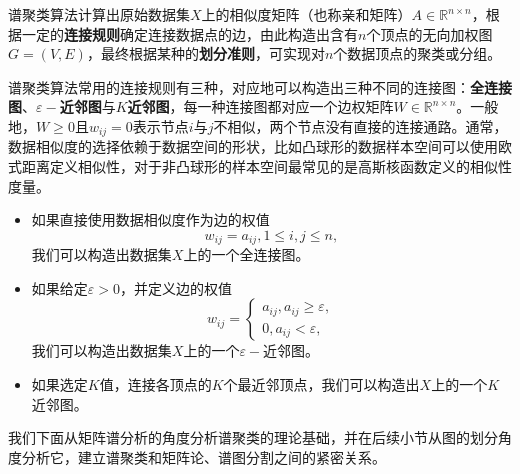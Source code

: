 谱聚类算法计算出原始数据集$X$上的相似度矩阵（也称亲和矩阵）$A\in \mathbb R^{n\times n}$，根据一定的\textbf{连接规则}确定连接数据点的边，由此构造出含有$n$个顶点的无向加权图$G=(V, E)$，最终根据某种的\textbf{划分准则}，可实现对$n$个数据顶点的聚类或分组。

谱聚类算法常用的连接规则有三种，对应地可以构造出三种不同的连接图：\textbf{全连接图}、\textbf{$\varepsilon-$近邻图}与\textbf{$K$近邻图}，每一种连接图都对应一个边权矩阵$W\in \mathbb R^{n\times n}$。一般地，$W\ge 0$且$w_{ij}=0$表示节点$i$与$j$不相似，两个节点没有直接的连接通路。通常，数据相似度的选择依赖于数据空间的形状，比如凸球形的数据样本空间可以使用欧式距离定义相似性，对于非凸球形的样本空间最常见的是高斯核函数定义的相似性度量。
\begin{itemize}
  \item 如果直接使用数据相似度作为边的权值
        \[
            w_{ij}=a_{ij}, 1\le i,j \le n,
        \]
        我们可以构造出数据集$X$上的一个全连接图。
  \item 如果给定$\varepsilon>0$，并定义边的权值
        \[
            w_{ij}=\left\{
            \begin{array}{rl}
              a_{ij}, a_{ij}\ge \varepsilon,\\
              0, a_{ij}<\varepsilon,
            \end{array}
            \right.
        \]
        我们可以构造出数据集$X$上的一个$\varepsilon-$近邻图。
  \item 如果选定$K$值，连接各顶点的$K$个最近邻顶点，我们可以构造出$X$上的一个$K$近邻图。
\end{itemize}

我们下面从矩阵谱分析的角度分析谱聚类的理论基础，并在后续小节从图的划分角度分析它，建立谱聚类和矩阵论、谱图分割之间的紧密关系。
